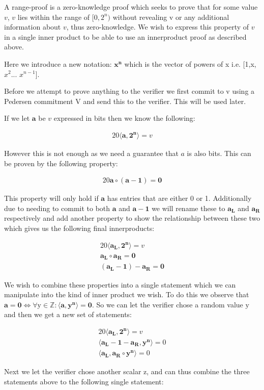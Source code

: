 \documentclass{article}
\newcommand{\eq}[1]{\begin{alignat*}{20}#1\end{alignat*}}
\renewcommand{\vec}[1]{\boldsymbol{#1}}
\newcommand{\ran}[1]{\mathrm{#1}}
\newcommand{\vecran}[1]{\mathbf{#1}}
\newcommand{\dotp}[2]{\langle #1, #2 \rangle}
\begin{document}
A range-proof is a zero-knowledge proof which seeks to prove that for some value $v$, $v$ lies within the range of $[0,2^n)$ without revealing v or any additional information about $v$, thus zero-knowledge. We wish to express this property of $v$ in a single inner product to be able to use an innerproduct proof as described above. 

Here we introduce a new notation: $\vec{x^n}$ which is the vector of powers of x i.e. [1,x,$x^2$... $x^{n-1}$].

Before we attempt to prove anything to the verifier we first commit to v using a Pedersen commitment V and send this to the verifier. This will be used later.

If we let $\vec{a}$ be $v$ expressed in bits then we know the following:

\eq{\dotp{\vec{a}}{\vec{2^n}} = v}

However this is not enough as we need a guarantee that $a$ is also bits. This can be proven by the following property: 

\eq{\vec{a}\circ (\vec{a} - \vec{1}) = \vec{0}}

This property will only hold if $\vec{a}$ has entries that are either 0 or 1. Additionally due to needing to commit to both $\vec{a}$ and $\vec{a} - \vec{1}$ we will rename these to $\vec{a_L}$ and $\vec{a_R}$ respectively and add another property to show the relationship between these two which gives us the following final innerproducts:

\eq{
	\dotp{\vec{a_L}}{\vec{2^n}} = v \\
	\vec{a_L}\circ \vec{a_R} = \vec{0} \\
	(\vec{a_L} - \vec{1}) - \vec{a_R} = \vec{0}
}

We wish to combine these properties into a single statement which we can manipulate into the kind of inner product we wish. To do this we observe that $\vec{a} = \vec{0} \iff \forall \ran{y}\in\mathbb{Z}: \dotp{\vec{a}}{\vec{y^n}} = \vec{0}$. So we can let the verifier chose a random value $\ran{y}$ and then we get a new set of statements:

\eq{
	\dotp{\vec{a_L}}{\vec{2^n}} = v \\
	\dotp{\vec{a_L} - \vec{1} - \vec{a_R}}{\vecran{y^n}} = 0 \\
	\dotp{\vec{a_L}}{\vec{a_R}\circ \vecran{y^n}} = 0
}

Next we let the verifier chose another scalar $\ran{z}$, and can thus combine the three statements above to the following single statement: 
\end{document}
